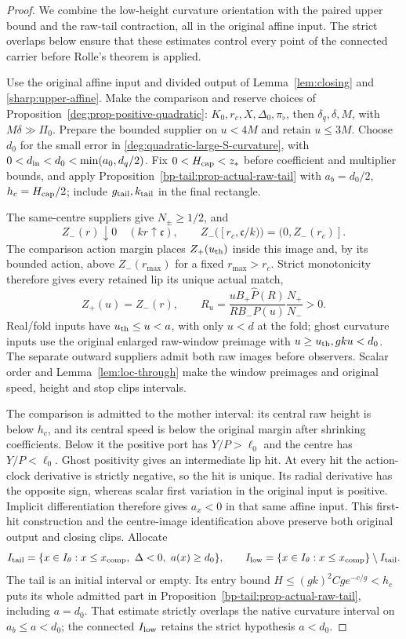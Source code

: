 \begin{proof}
We combine the low-height curvature orientation with the paired upper
bound and the raw-tail contraction, all in the original affine input.
The strict overlaps below ensure that these estimates control every
point of the connected carrier before Rolle's theorem is applied.

Use the original affine input and divided output of
Lemma~\ref{lem:closing} and \eqref{sharp:upper-affine}.
Make the comparison and reserve choices of
Proposition~\ref{deg:prop-positive-quadratic}: \(K_0,r_c,X,\Delta_0,\pi_\flat\),
then \(\delta_q,\delta,M\), with \(M\delta\gg\Pi_0\).
Prepare the bounded supplier on \(u<4M\) and retain \(u\le3M\).
Choose \(d_0\) for the small error in
\eqref{deg:quadratic-large-S-curvature}, with
\(0<d_{\rm in}<d_0<\min(a_0,d_q/2)\).
Fix \(0<H_{\rm cap}<z_*\) before coefficient and multiplier bounds,
and apply Proposition~\ref{bp-tail:prop-actual-raw-tail} with
\(a_b=d_0/2\), \(h_c=H_{\rm cap}/2\); include
\(g_{\rm tail},k_{\rm tail}\) in the final rectangle.

The same-centre suppliers give \(N_\pm\ge1/2\), and
\[
 Z_-(r)\downarrow0\quad(kr\uparrow\mathfrak c),\qquad
 Z_-([r_c,\mathfrak c/k))=(0,Z_-(r_c)].
\]
The comparison action margin places \(Z_+(u_{\rm th})\) inside
this image and, by its bounded action, above \(Z_-(r_{\max})\)
for a fixed \(r_{\max}>r_c\). Strict monotonicity therefore gives
every retained lip its unique actual match,
\[
 Z_+(u)=Z_-(r),\qquad
 R_u=\frac{uB_+\widehat P(R)}{RB_-P(u)}\frac{N_+}{N_-}>0.
\]
Real/fold inputs have \(u_{\rm th}\le u<a\), with only \(u<d\)
at the fold; ghost curvature inputs use the original enlarged
raw-window preimage with \(u\ge u_{\rm th},gku<d_0\).
The separate outward suppliers admit both raw images before observers.
Scalar order and Lemma~\ref{lem:loc-through} make the window
preimages and original speed, height and stop clips intervals.

The comparison is admitted to the mother interval: its central
raw height is below \(h_c\), and its central speed is below the
original margin after shrinking coefficients. Below it the positive
port has \(Y/P>\ell_0\) and the centre has \(Y/P<\ell_0\).
Ghost positivity gives an intermediate lip hit. At every hit the
action-clock derivative is strictly negative, so the hit is unique.
Its radial derivative has the opposite sign, whereas scalar first
variation in the original input is positive. Implicit differentiation
therefore gives \(a_x<0\) in that same affine input. This first-hit
construction and the centre-image identification above preserve both
original output and closing clips. Allocate
\[
 I_{\rm tail}=\{x\in I_\theta:x\le x_{\rm comp},\ \Delta<0,
                                      \ a(x)\ge d_0\},\qquad
 I_{\rm low}=\{x\in I_\theta:x\le x_{\rm comp}\}\setminus I_{\rm tail}.
\]
The tail is an initial interval or empty. Its entry bound
\(H\le(gk)^2Cg e^{-c/g}<h_c\) puts its whole admitted part in
Proposition~\ref{bp-tail:prop-actual-raw-tail}, including \(a=d_0\).
That estimate strictly overlaps the native curvature interval on
\(a_b\le a<d_0\); the connected \(I_{\rm low}\) retains the
strict hypothesis \(a<d_0\).


\end{proof}

